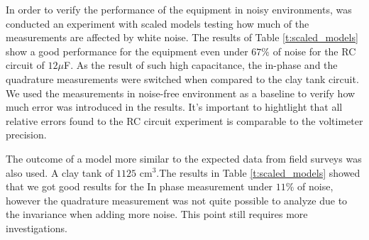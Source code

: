 \documentclass{vie16}
\begin{document}
In order to verify the performance of the equipment in noisy
environments, was conducted an experiment with scaled models testing
how much of the measurements are affected by white noise. The results
of Table \ref{t:scaled_models} show a good performance for the
equipment even under
$67\%$ of noise for the RC circuit of $12 \mu$F.
 As the result of such high capacitance, the in-phase and the quadrature measurements were switched when compared to the clay tank circuit.
 We used the measurements in noise-free environment as a baseline to verify how
much error was introduced in the results. It's important to
hightlight that all relative errors found to the RC circuit
experiment is comparable to the voltimeter precision.


The outcome of a model more similar to the expected data from field
surveys was also used. A clay tank of $1125$ cm$^3$.The results in Table
\ref{t:scaled_models} showed that we got good results for the In phase
measurement under $11\%$ of noise, however the quadrature measurement
was not quite possible to analyze due to the invariance when adding
more noise. This point still requires more investigations.
\end{document}
